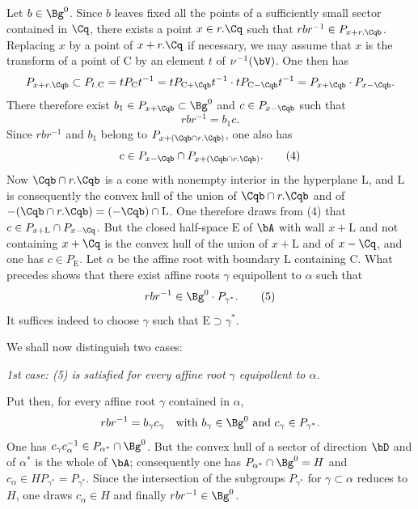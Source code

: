 \documentclass[12pt,a4paper,oneside,english]{smfart}
\makeatletter
\newcommand{\btpageanchor}[1]{\Hy@raisedlink{\hypertarget{p:#1}{}}}
\newcommand{\btpage}[1]{\marginnote{p.~#1}\btpageanchor{#1}}
\newcommand{\pg}[1]{\btpage{#1}}
\theoremstyle{definition}
\theoremstyle{bt}
\makeatother
\begin{document}
Let $b\in\Bg^{0}$. Since $b$ leaves fixed all the points of a sufficiently small
sector contained in $\Cq$, there exists a point $x\in r.\Cq$ such that
$rbr^{-1}\in P_{x+r.\Cqb}$. Replacing $x$ by a point of $x+r.\Cq$ if necessary,
we may assume that $x$ is the transform of a point of $\mathrm{C}$ by an element
$t$ of $\nu^{-1}(\bV)$. One then has
\[
P_{x+r.\Cqb}\subset P_{t.\mathrm{C}}=tP_{\mathrm{C}}t^{-1} =tP_{\mathrm{C}+\Cqb}t^{-1}\cdot tP_{\mathrm{C}-\Cqb}t^{-1} =P_{x+\Cqb}\cdot P_{x-\Cqb}.
\]
There therefore exist $b_{1}\in P_{x+\Cqb}\subset\Bg^{0}$ and
$c\in P_{x-\Cqb}$ such that
\begin{equation*}
rbr^{-1}=b_{1}c.\tag{3}
\end{equation*}
Since $rbr^{-1}$ and $b_{1}$ belong to $P_{x+(\Cqb\cap r.\Cqb)}$, one also has
\begin{equation*}
c\in P_{x-\Cqb}\cap P_{x+(\Cqb\cap r.\Cqb)}.\tag{4}
\end{equation*}
Now $\Cqb\cap r.\Cqb$ is a cone with nonempty interior in the hyperplane
$\mathrm{L}$, and $\mathrm{L}$ is consequently the convex hull of the union of
$\Cqb\cap r.\Cqb$ and of $-(\Cqb\cap r.\Cqb)=(-\Cqb)\cap \mathrm{L}$. One
therefore draws from (4) that
$c\in P_{x+\mathrm{L}}\cap P_{x-\Cq}$. But the closed half-space $\mathrm{E}$ of
$\bA$ with wall $x+\mathrm{L}$ and not containing $x+\Cq$ is the convex hull of
the union of $x+\mathrm{L}$ and of $x-\Cq$, and one has $c\in P_{\mathrm{E}}$.
Let $\alpha$ be the affine root with boundary $\mathrm{L}$ containing
$\mathrm{C}$. What precedes shows that there exist affine roots $\gamma$
equipollent to $\alpha$ such that
\begin{equation*}
rbr^{-1}\in\Bg^{0}\cdot P_{\gamma^{*}}.\tag{5}
\end{equation*}
It suffices indeed to choose $\gamma$ such that $\mathrm{E}\supset\gamma^{*}$.

We shall now distinguish two cases:

\smallskip
\noindent
\emph{1st case: \textup{(5)} is satisfied for every affine root $\gamma$
equipollent to $\alpha$.}

Put then, for every affine root $\gamma$ contained in $\alpha$,
\[
rbr^{-1}=b_{\gamma}c_{\gamma}\quad\text{with } b_{\gamma}\in\Bg^{0}\text{ and } c_{\gamma}\in P_{\gamma^{*}}.
\]
\pg{91}
One has $c_{\gamma}c_{\alpha}^{-1}\in P_{\alpha^{*}}\cap\Bg^{0}$. But the convex
hull of a sector of direction $\bD$ and of $\alpha^{*}$ is the whole of $\bA$;
consequently one has $P_{\alpha^{*}}\cap\Bg^{0}=H$ and
$c_{\alpha}\in HP_{\gamma^{*}}=P_{\gamma^{*}}$. Since the intersection of the
subgroups $P_{\gamma^{*}}$ for $\gamma\subset\alpha$ reduces to $H$, one draws
$c_{\alpha}\in H$ and finally $rbr^{-1}\in\Bg^{0}$.
\end{document}
